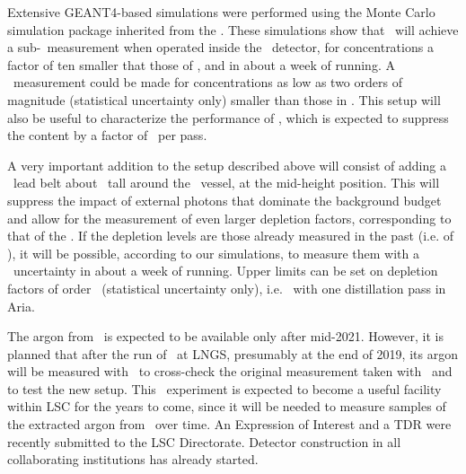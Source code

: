 Extensive GEANT4-based simulations were performed using the Monte Carlo simulation package inherited from the \DSf.  These simulations show that  \DArT\  will  achieve a sub-\DArTUArPercentErrorWithoutLeadWithDepletionTen\ measurement when operated inside the \ArDM\ detector, for  concentrations a factor of ten smaller that those of \AAr, and in about a week of running.  A \DArTUArPercentErrorWithoutLeadWithDepletionHundred\ measurement could be made for  concentrations as low as two orders of magnitude (statistical uncertainty only) smaller than those in \AAr. This setup will also be useful to characterize the performance of \Aria, which is expected to suppress the  content by a factor of \AriaDepletionPerPass\ per pass.  

A very important addition to the setup described above will consist of adding a \DArTLeadBeltMass\ lead belt about \DArTLeadBeltHeight\ tall around the \ArDM\ vessel, at the mid-height position.  This will suppress the impact of external photons that dominate the background budget and allow for the measurement of even larger  depletion factors, corresponding to that of the \UAr.  If the depletion levels are those already measured in the past (i.e. of \DSfUArDepletion), it will be possible, according to our simulations, to measure them with a \DArTUArPercentErrorWithLead\ uncertainty in about a week of running. Upper limits can be set on depletion factors of order \DArTUArDepletionWithLead\ (statistical uncertainty only), i.e. \UAr\ with one  distillation pass in Aria.

The argon from \Urania\ is expected to be available only after mid-2021. However, it is planned that after the run of \DSfs\ at LNGS, presumably at the end of 2019, its argon will be measured with \DArT\ to cross-check the original measurement taken with \DSfs\ and to test the new setup. This  \DArT\  experiment is expected to become a useful facility within LSC for the years to come, since it will be needed to measure samples of the extracted argon from \Urania\ over time.  An Expression of Interest and a TDR were recently submitted to the LSC Directorate. Detector construction in all collaborating institutions has already started.   